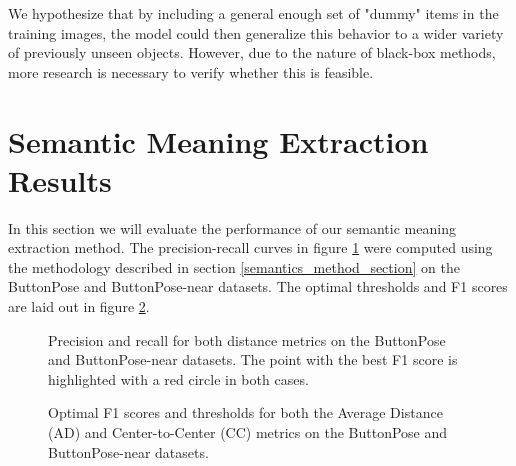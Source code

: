 We hypothesize that by including a general enough set of "dummy" items in the training images, the model could then generalize this behavior to a wider variety of previously unseen objects. However, due to the nature of black-box methods, more research is necessary to verify whether this is feasible.

\section{Semantic Meaning Extraction Results}

In this section we will evaluate the performance of our semantic meaning extraction method. The precision-recall curves in figure \ref{fig:precisionrecall} were computed using the methodology described in section \ref{semantics_method_section} on the ButtonPose and ButtonPose-near datasets. The optimal thresholds and F1 scores are laid out in figure \ref{fig:optimal_F1}.

\begin{figure}[htp]
    \centering

    
    \caption{Precision and recall for both distance metrics on the ButtonPose and ButtonPose-near datasets. The point with the best F1 score is highlighted with a red circle in both cases.}
    \label{fig:precisionrecall}
\end{figure}

\begin{figure}
    \quad
    
    \caption{Optimal F1 scores and thresholds for both the Average Distance (AD) and Center-to-Center (CC) metrics on the ButtonPose and ButtonPose-near datasets.}
    \label{fig:optimal_F1}
\end{figure}

